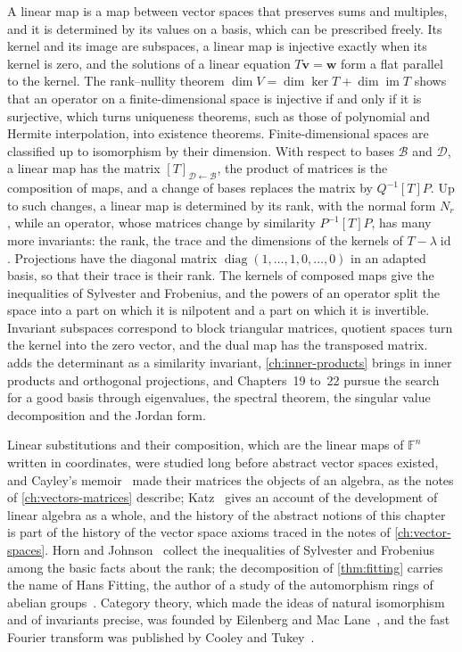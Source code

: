 \bigskip
A linear map is a map between vector spaces that preserves sums and multiples, and it is determined by its values on a basis, which can be prescribed freely. Its kernel and its image are subspaces, a linear map is injective exactly when its kernel is zero, and the solutions of a linear equation $T\mathbf v=\mathbf w$ form a flat parallel to the kernel. The rank--nullity theorem $\dim V=\dim\ker T+\dim\operatorname{im}T$ shows that an operator on a finite-dimensional space is injective if and only if it is surjective, which turns uniqueness theorems, such as those of polynomial and Hermite interpolation, into existence theorems. Finite-dimensional spaces are classified up to isomorphism by their dimension. With respect to bases $\mathcal B$ and $\mathcal D$, a linear map has the matrix $[T]_{\mathcal D\leftarrow\mathcal B}$, the product of matrices is the composition of maps, and a change of bases replaces the matrix by $Q^{-1}[T]P$. Up to such changes, a linear map is determined by its rank, with the normal form $N_r$, while an operator, whose matrices change by similarity $P^{-1}[T]P$, has many more invariants: the rank, the trace and the dimensions of the kernels of $T-\lambda\operatorname{id}$. Projections have the diagonal matrix $\operatorname{diag}(1,\ldots,1,0,\ldots,0)$ in an adapted basis, so that their trace is their rank. The kernels of composed maps give the inequalities of Sylvester and Frobenius, and the powers of an operator split the space into a part on which it is nilpotent and a part on which it is invertible. Invariant subspaces correspond to block triangular matrices, quotient spaces turn the kernel into the zero vector, and the dual map has the transposed matrix.  adds the determinant as a similarity invariant, \cref{ch:inner-products} brings in inner products and orthogonal projections, and Chapters~19 to~22 pursue the search for a good basis through eigenvalues, the spectral theorem, the singular value decomposition and the Jordan form.

\chapternotes

Linear substitutions and their composition, which are the linear maps of $\mathbb F^n$ written in coordinates, were studied long before abstract vector spaces existed, and Cayley's memoir~\cite{cayley1858} made their matrices the objects of an algebra, as the notes of \cref{ch:vectors-matrices} describe; Katz~\cite{katz2009} gives an account of the development of linear algebra as a whole, and the history of the abstract notions of this chapter is part of the history of the vector space axioms traced in the notes of \cref{ch:vector-spaces}. Horn and Johnson~\cite[Sect.~0.4]{horn2013} collect the inequalities of Sylvester and Frobenius among the basic facts about the rank; the decomposition of \cref{thm:fitting} carries the name of Hans Fitting, the author of a study of the automorphism rings of abelian groups~\cite{fitting1933}. Category theory, which made the ideas of natural isomorphism and of invariants precise, was founded by Eilenberg and Mac Lane~\cite{eilenberg1945,maclane1998}, and the fast Fourier transform was published by Cooley and Tukey~\cite{cooley1965}.

